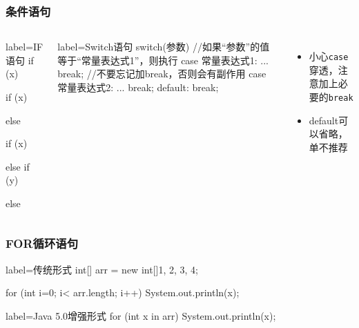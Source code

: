 \begin{frame}[fragile]
  \frametitle{条件语句}
    \begin{columns}
        \begin{javacode*}{label=IF语句}
       if (x) {
       
       } 
       
       if (x) {
       
       } else {
       
       }
       
       if (x) {
       
       } else if (y) {
       
       } else {
       
       }
      \end{javacode*}
      \begin{javacode*}{label=Switch语句}
        switch(参数) {
          //如果“参数”的值等于“常量表达式1”，则执行
          case 常量表达式1: 
            ...
            break; 
            //不要忘记加break，否则会有副作用
          case 常量表达式2: 
            ...
            break;
          default: 
            break;
        }
      \end{javacode*}
      \begin{itemize}
        \item 小心\texttt{case}穿透，注意加上必要的\texttt{break}
        \item default可以省略，单不推荐
      \end{itemize}
    \end{columns}
\end{frame}


\begin{frame}[fragile]
  \frametitle{FOR循环语句}
  \begin{javacode*}{label=传统形式}
    int[] arr = new int[]{1, 2, 3, 4};
    
    for (int i=0; i< arr.length; i++) {
      System.out.println(x);
    }
  \end{javacode*}
  
  \begin{javacode*}{label=Java 5.0增强形式}
    for (int x in arr) {
      System.out.println(x);
    }
  \end{javacode*}
\end{frame}

